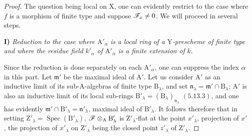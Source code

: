 \begin{proof}
The question being local on $\mathrm{X}$, one can evidently restrict to the case where $f$ is
a morphism of finite type and suppose $\mathscr{F}_x\neq 0$. We will proceed in several steps.

\medskip
\noindent\textbf{I)} \emph{Reduction to the case where $\mathrm{A}'_\alpha$ is a local ring of a $\mathrm{Y}$-prescheme of finite type and where the
residue field $k'_\alpha$ of $\mathrm{A}'_\alpha$ is a finite extension of $k$.}

\medskip
Since the reduction is done separately on each $\mathrm{A}'_\alpha$, one can suppress the index $\alpha$ in
this part. Let $\mathfrak{m}'$ be the maximal ideal of $\mathrm{A}'$. Let us consider $\mathrm{A}'$ as an
inductive limit of its sub-$\mathrm{A}$-algebras of finite type $\mathrm{B}_\lambda$, and set $\mathfrak{n}_\lambda=\mathfrak{m}'\cap\mathrm{B}_\lambda$; $\mathrm{A}'$ is also an
inductive limit of its local sub-rings $\mathrm{B}'_\lambda=(\mathrm{B}_\lambda)_{\mathfrak{n}_\lambda}$ $(5.13.3)$, and one has evidently
$\mathfrak{m}'\cap\mathrm{B}'_\lambda=\mathfrak{n}'_\lambda$, maximal ideal of $\mathrm{B}'_\lambda$. It follows therefore  that in
setting $\mathrm{Z}'_\lambda=\operatorname{Spec}(\mathrm{B}'_\lambda)$, $\mathscr{F}\otimes_\mathrm{A}\mathrm{B}'_\lambda$ is $\mathrm{Z}'_\lambda$-flat at the point $x'_\lambda$, projection of $x'$, the projection
of $x'_\lambda$ on $\mathrm{Z}'_\lambda$ being the closed point $z'_\lambda$ of $\mathrm{Z}'_\lambda$.


\end{proof}
